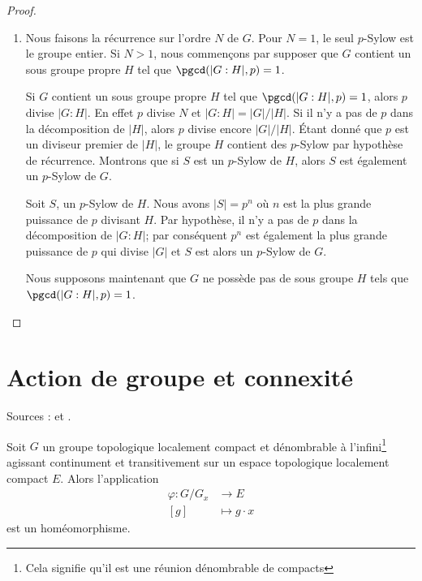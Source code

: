 \begin{proof}
    \begin{enumerate}
        \item
            Nous faisons la récurrence sur l'ordre \( N\) de \( G\). Pour \( N=1\), le seul \( p\)-Sylow est le groupe entier. Si \( N>1\), nous commençons par supposer que \( G\) contient un sous groupe propre \( H\) tel que \( \pgcd(| G:H |,p)=1\).

            Si \( G\) contient un sous groupe propre \( H\) tel que \( \pgcd(| G:H |,p)=1\), alors \( p\) divise \( | G:H |\). En effet \( p\) divise \( N\) et \( | G:H |=| G |/| H |\). Si il n'y a pas de \( p\) dans la décomposition de \( | H |\), alors \( p\) divise encore \( | G |/| H |\). Étant donné que \( p\) est un diviseur premier de \( | H |\), le groupe \( H\) contient des \( p\)-Sylow par hypothèse de récurrence. Montrons que si \( S\) est un \( p\)-Sylow de \( H\), alors \( S\) est également un $p$-Sylow de \( G\).

            Soit \( S\), un $p$-Sylow de \( H\). Nous avons \( | S |=p^n\) où \( n\) est la plus grande puissance de \( p\) divisant \( H\). Par hypothèse, il n'y a pas de \( p\) dans la décomposition de \( | G:H |\); par conséquent \( p^n\) est également la plus grande puissance de \( p\) qui divise \( | G |\) et \( S\) est alors un $p$-Sylow de \( G\).

            Nous supposons maintenant que \( G\) ne possède pas de sous groupe \( H\) tels que \( \pgcd(| G:H |,p)=1\).

    \end{enumerate}
\end{proof}


\section{Action de groupe et connexité}

Sources : \cite{MneimneLie} et .

\begin{theorem}     \label{ThojrLKZk}
    Soit \( G\) un groupe topologique localement compact et dénombrable à l'infini\footnote{Cela signifie qu'il est une réunion dénombrable de compacts} agissant continument et transitivement sur un espace topologique localement compact \( E\). Alors l'application
    \begin{equation}
        \begin{aligned}
            \varphi\colon G/G_x&\to E \\
            [g]&\mapsto g\cdot x 
        \end{aligned}
    \end{equation}
    est un homéomorphisme.
\end{theorem}

